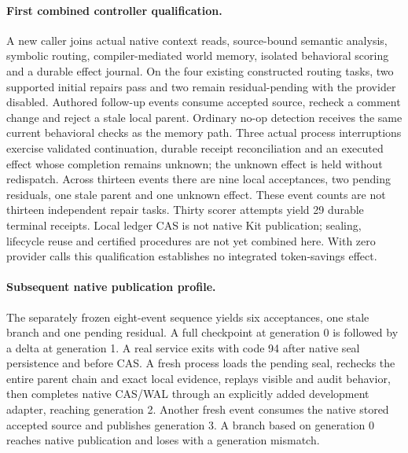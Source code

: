 \paragraph{First combined controller qualification.}
A new caller joins actual native context reads, source-bound semantic analysis,
symbolic routing, compiler-mediated world memory, isolated behavioral scoring
and a durable effect journal. On the four existing constructed routing tasks,
two supported initial repairs pass and two remain residual-pending with the
provider disabled. Authored follow-up events consume accepted source, recheck
a comment change and reject a stale local parent. Ordinary no-op detection
receives the same current behavioral checks as the memory path.
Three actual process interruptions exercise validated continuation, durable
receipt reconciliation and an executed effect whose completion remains unknown;
the unknown effect is held without redispatch. Across thirteen events there are
nine local acceptances, two pending residuals, one stale parent and one unknown
effect. These event counts are not thirteen independent repair tasks. Thirty
scorer attempts yield 29 durable terminal receipts. Local ledger CAS is not
native Kit publication; sealing, lifecycle reuse and certified procedures are
not yet combined here. With zero provider calls this qualification establishes
no integrated token-savings effect.


\paragraph{Subsequent native publication profile.}
The separately frozen eight-event sequence yields six acceptances, one stale
branch and one pending residual. A full checkpoint at generation 0 is followed
by a delta at generation 1. A real service exits with code 94 after native
seal persistence and before CAS. A fresh process loads the pending seal,
rechecks the entire parent chain and exact local evidence, replays visible
and audit behavior, then completes native CAS/WAL through an explicitly added
development adapter, reaching generation 2. Another fresh event consumes the
native stored accepted source and publishes generation 3. A branch based on
generation 0 reaches native publication and loses with a generation mismatch.

